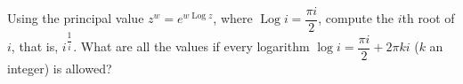 Using the principal value $z^w=e^{w\operatorname{Log}z}$, where $\operatorname{Log}i=\dfrac{\pi i}{2}$, compute the $i$th root of $i$, that is, $i^{\dfrac{1}{i}}$. What are all the values if every logarithm $\log i=\dfrac{\pi i}{2}+2\pi ki$ ($k$ an integer) is allowed?

